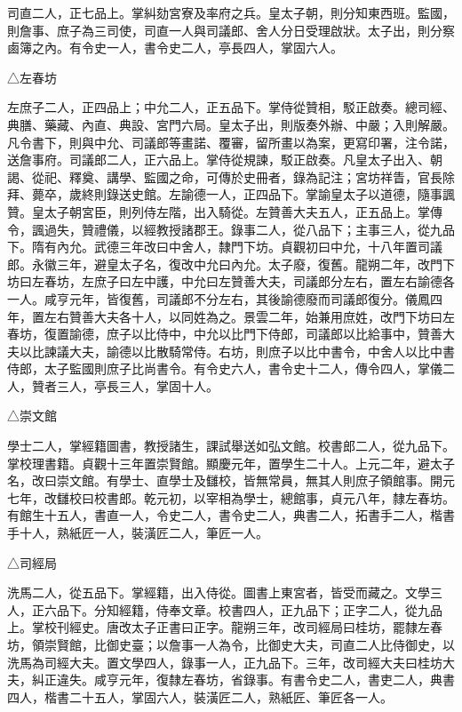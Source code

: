 \begin{pinyinscope}
 司直二人，正七品上。掌糾劾宮寮及率府之兵。皇太子朝，則分知東西班。監國，則詹事、庶子為三司使，司直一人與司議郎、舍人分日受理啟狀。太子出，則分察鹵簿之內。有令史一人，書令史二人，亭長四人，掌固六人。



 △左春坊



 左庶子二人，正四品上；中允二人，正五品下。掌侍從贊相，駁正啟奏。總司經、典膳、藥藏、內直、典設、宮門六局。皇太子出，則版奏外辦、中嚴；入則解嚴。凡令書下，則與中允、司議郎等畫諾、覆審，留所畫以為案，更寫印署，注令諾，送詹事府。司議郎二人，正六品上。掌侍從規諫，駁正啟奏。凡皇太子出入、朝謁、從祀、釋奠、講學、監國之命，可傳於史冊者，錄為記注；宮坊祥眚，官長除拜、薨卒，歲終則錄送史館。左諭德一人，正四品下。掌諭皇太子以道德，隨事諷贊。皇太子朝宮臣，則列侍左階，出入騎從。左贊善大夫五人，正五品上。掌傳令，諷過失，贊禮儀，以經教授諸郡王。錄事二人，從八品下；主事三人，從九品下。隋有內允。武德三年改曰中舍人，隸門下坊。貞觀初曰中允，十八年置司議郎。永徽三年，避皇太子名，復改中允曰內允。太子廢，復舊。龍朔二年，改門下坊曰左春坊，左庶子曰左中護，中允曰左贊善大夫，司議郎分左右，置左右諭德各一人。咸亨元年，皆復舊，司議郎不分左右，其後諭德廢而司議郎復分。儀鳳四年，置左右贊善大夫各十人，以同姓為之。景雲二年，始兼用庶姓，改門下坊曰左春坊，復置諭德，庶子以比侍中，中允以比門下侍郎，司議郎以比給事中，贊善大夫以比諫議大夫，諭德以比散騎常侍。右坊，則庶子以比中書令，中舍人以比中書侍郎，太子監國則庶子比尚書令。有令史六人，書令史十二人，傳令四人，掌儀二人，贊者三人，亭長三人，掌固十人。



 △崇文館



 學士二人，掌經籍圖書，教授諸生，課試舉送如弘文館。校書郎二人，從九品下。掌校理書籍。貞觀十三年置崇賢館。顯慶元年，置學生二十人。上元二年，避太子名，改曰崇文館。有學士、直學士及讎校，皆無常員，無其人則庶子領館事。開元七年，改讎校曰校書郎。乾元初，以宰相為學士，總館事，貞元八年，隸左春坊。有館生十五人，書直一人，令史二人，書令史二人，典書二人，拓書手二人，楷書手十人，熟紙匠一人，裝潢匠二人，筆匠一人。



 △司經局



 洗馬二人，從五品下。掌經籍，出入侍從。圖書上東宮者，皆受而藏之。文學三人，正六品下。分知經籍，侍奉文章。校書四人，正九品下；正字二人，從九品上。掌校刊經史。唐改太子正書曰正字。龍朔三年，改司經局曰桂坊，罷隸左春坊，領崇賢館，比御史臺；以詹事一人為令，比御史大夫，司直二人比侍御史，以洗馬為司經大夫。置文學四人，錄事一人，正九品下。三年，改司經大夫曰桂坊大夫，糾正違失。咸亨元年，復隸左春坊，省錄事。有書令史二人，書吏二人，典書四人，楷書二十五人，掌固六人，裝潢匠二人，熟紙匠、筆匠各一人。




\end{pinyinscope}
